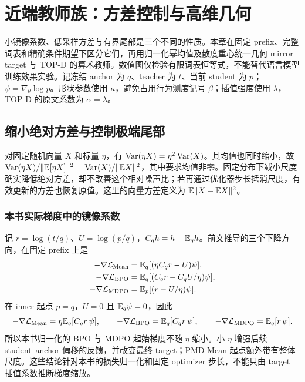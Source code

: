 \chapter{近端教师族：方差控制与高维几何}
\label{ch:proximal-families}

小镜像系数、低采样方差与有界尾部是三个不同的性质。本章在固定 prefix、完整词表和精确条件期望下区分它们，再用归一化幂均值及散度重心统一几何 mirror target 与 TOP-D 的算术教师。数值图仅检验有限词表恒等式，不能替代语言模型训练效果实验。记冻结 anchor 为 $q$、teacher 为 $t$、当前 student 为 $p$；$\psi=\nabla_\theta\log p$。形状参数使用 $\kappa$，避免占用行为测度记号 $\beta$；插值强度使用 $\lambda$，TOP-D 的原文系数为 $\alpha=\lambda$。

\section{缩小绝对方差与控制极端尾部}

对固定随机向量 $X$ 和标量 $\eta$，有 $\operatorname{Var}(\eta X)=\eta^2\operatorname{Var}(X)$。其均值也同时缩小，故 $\operatorname{Var}(\eta X)/\|\mathbb E[\eta X]\|^2=\operatorname{Var}(X)/\|\mathbb E X\|^2$，其中要求均值非零。固定分布下减小尺度确实降低绝对方差，却不改善这个相对噪声比；若再通过优化器步长抵消尺度，有效更新的方差也恢复原值。这里的向量方差定义为 $\mathbb E\|X-\mathbb E X\|^2$。

\subsection{本书实际梯度中的镜像系数}

记 $r=\log(t/q)$、$U=\log(p/q)$，$C_q h=h-\mathbb E_qh$。前文推导的三个下降方向，在固定 prefix 上是
\begin{align}
 -\nabla\mathcal L_{\mathrm{Mean}}&=\mathbb E_q[(\eta C_qr-U)\psi],\\
 -\nabla\mathcal L_{\mathrm{BPO}}&=\mathbb E_q[(C_qr-C_qU/\eta)\psi],\\
 -\nabla\mathcal L_{\mathrm{MDPO}}&=\mathbb E_p[(r-U/\eta)\psi].
\end{align}
在 inner 起点 $p=q$，$U=0$ 且 $\mathbb E_q\psi=0$，因此
\begin{equation}
 -\nabla\mathcal L_{\mathrm{Mean}}=\eta\mathbb E_q[C_qr\,\psi],\qquad
 -\nabla\mathcal L_{\mathrm{BPO}}=\mathbb E_q[C_qr\,\psi],\qquad
 -\nabla\mathcal L_{\mathrm{MDPO}}=\mathbb E_q[r\,\psi].
\end{equation}
所以本书归一化的 BPO 与 MDPO 起始梯度不随 $\eta$ 缩小。小 $\eta$ 增强后续 student--anchor 偏移的反馈，并改变最终 target；PMD-Mean 起点额外带有整体尺度。这些结论针对本书的损失归一化和固定 optimizer 步长，不能只由 target 插值系数推断梯度缩放。

